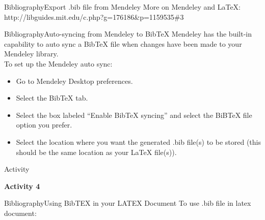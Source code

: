 \documentclass{beamer}
\begin{document}
\begin{darkframes}
\begin{frame}[<+->]{Bibliography}{Export .bib file from Mendeley}
\alert{More on Mendeley and LaTeX}: http://libguides.mit.edu/c.php?g=176186\&p=1159535\#3
\end{frame}


\begin{frame}[<+->]{Bibliography}{Auto-syncing from Mendeley to BibTeX}
	Mendeley has the built-in capability to auto sync a BibTeX file when changes have been made to your Mendeley library.\\
	To set up the Mendeley auto sync:
	\begin{itemize}
		\item Go to Mendeley Desktop preferences.
		\item Select the BibTeX tab. 
		\item Select the box labeled “Enable BibTeX syncing” and select the BiBTeX file option you prefer.
		\item Select the location where you want the generated .bib file(s) to be stored (this should be the same location as your LaTeX file(s)).
	\end{itemize}
\end{frame}

\begin{frame}[fragile]{Activity}
	\begin{center}
		{\Large \textbf{Activity 4}}
	\end{center}
	
\end{frame}

\begin{frame}[<+->]{Bibliography}{Using BibTEX in your LATEX Document}
	To use .bib file in  latex document:
\end{frame}



\end{darkframes}
\end{document}
